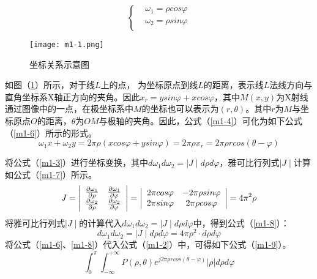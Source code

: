 \documentclass[withoutpreface,bwprint]{cumcmthesis} %
\begin{document}
\begin{equation}
	\label{m1-5}
	\left\{
	\begin{split}
		& \omega_1 = \rho cos\varphi \\
		& \omega_2 = \rho sin\varphi \\
	\end{split}
	\right.
\end{equation}


\begin{figure}[h]
\small
\centering
\texttt{[image: m1-1.png]}
\caption{坐标关系示意图} \label{fig:m1-1}
\end{figure}


如图（\ref{fig:m1-1}）所示，对于线$L$上的点， 为坐标原点到线$L$的距离，表示线$L$法线方向与直角坐标系X轴正方向的夹角。因此$x_r = y sin\varphi + x cos \varphi$，其中$M(x,y)$为X射线通过图像中的一点，在极坐标系中$M$的坐标也可以表示为$(r,\theta)$。其中$r$为$M$与坐标原点$O$的距离，$\theta$为$OM$与极轴的夹角。因此，公式（\ref{m1-4}）可化为如下公式（\ref{m1-6}）所示的形式。 
\begin{equation}
	\label{m1-6}
	\omega_1 x + \omega_2 y = 2\pi \rho (x cos\varphi + y sin\varphi) = 2\pi \rho x_r = 2\pi\rho r cos (\theta - \varphi)
\end{equation}

将公式（\ref{m1-3}）进行坐标变换，其中$d \omega_1 d \omega_2  = \mid J \mid d\rho d\varphi$，雅可比行列式$\mid J \mid$计算如公式（\ref{m1-7}）所示。
\begin{equation}
	\label{m1-7}
J = 
\left| {\begin{array}{*{20}c}
    \frac{\partial \omega_1}{\partial \rho} & \frac{\partial \omega_1}{\partial \varphi}\\   
     \frac{\partial \omega_2}{\partial \rho} & \frac{\partial \omega_2}{\partial \varphi}\\
\end{array}} \right| = \left| {\begin{array}{*{20}c}
    2\pi cos \varphi & -2\pi \rho sin \varphi\\
    2\pi sin \varphi & 2\pi \rho cos \varphi\\   
\end{array}} \right| = 4\pi^2\rho
\end{equation}
将雅可比行列式$\mid J \mid$的计算代入$d \omega_1 d \omega_2  = \mid J \mid d\rho d\varphi$中，得到公式（\ref{m1-8}）：
\begin{equation}
	\label{m1-8}
	d \omega_1 d \omega_2  = \mid J \mid d\rho d\varphi = 4\pi\rho^2 \cdot d\rho d \varphi
\end{equation}
将公式（\ref{m1-6}、\ref{m1-8}）代入公式（\ref{m1-2}）中，可得如下公式（\ref{m1-9}）。
\begin{equation}
	\label{m1-9}
	\int^{\pi}_{0} \int_{-\infty}^{+\infty} P(\rho,\theta)e^{j2\pi\rho r cos(\theta - \varphi)} |\rho| d \rho d \varphi
\end{equation}
\end{document}
